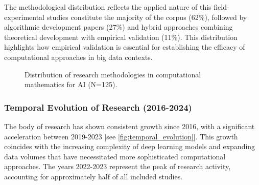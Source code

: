 \documentclass[format=acmsmall, natbib=true, citestyle=acmauthoryear]{acmart}
\begin{document}
The methodological distribution reflects the applied nature of this field-experimental studies constitute the majority of the corpus (62\%), followed by algorithmic development papers (27\%) and hybrid approaches combining theoretical development with empirical validation (11\%). This distribution highlights how empirical validation is essential for establishing the efficacy of computational approaches in big data contexts.

\begin{figure}[ht]
    \centering
    \caption{Distribution of research methodologies in computational mathematics for AI (N=125).}
    \label{fig:methodology_distribution}
\end{figure}

\subsubsection{Temporal Evolution of Research (2016-2024)}\label{subsubsec:overview-of-included-studies:temporal-evolution-of-research-2016-2024}
The body of research has shown consistent growth since 2016, with a significant acceleration between 2019-2023 [see \cref{fig:temporal_evolution}]. This growth coincides with the increasing complexity of deep learning models and expanding data volumes that have necessitated more sophisticated computational approaches. The years 2022-2023 represent the peak of research activity, accounting for approximately half of all included studies.
\end{document}
